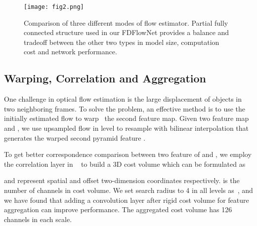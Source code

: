 \documentclass{article}
\begin{document}
\begin{figure}[t]
	\centering
	\texttt{[image: fig2.png]}
	\caption{Comparison of three different modes of flow estimator. Partial fully connected structure used in our FDFlowNet provides a balance and tradeoff between the other two types in model size, computation cost and network performance.}
	\label{fig:2}
\end{figure}

\subsection{Warping, Correlation and Aggregation}
One challenge in optical flow estimation is the large displacement of objects in two neighboring frames. To solve the problem, an effective method is to use the initially estimated flow to warp~\cite{10.1007/978-3-540-24673-2_3} the second feature map. Given two feature map  and , we use upsampled flow in level  to resample  with bilinear interpolation that generates the warped second pyramid feature .

To get better correspondence comparison between two feature of  and , we employ the correlation layer in ~\cite{Fischer2015FlowNetLO} to build a 3D cost volume which can be formulated as

 and  represent spatial and offset two-dimension coordinates respectively.  is the number of channels in cost volume. We set search radius to 4 in all levels as~\cite{Sun_2018_CVPR}, and we have found that adding a convolution layer after rigid cost volume for feature aggregation can improve performance. The aggregated cost volume  has 126 channels in each scale.
\end{document}
